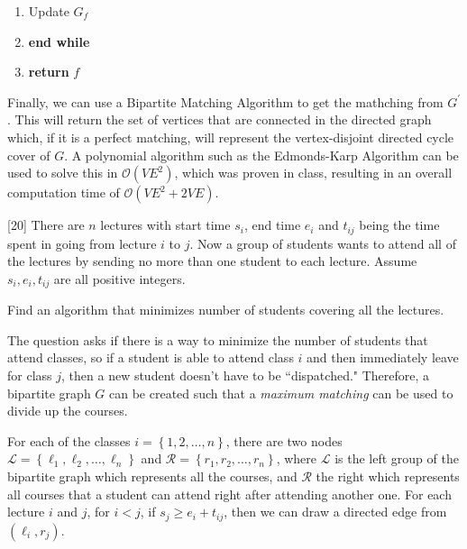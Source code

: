 \documentclass[addpoints]{exam}
\begin{document}
\begin{questions}
\begin{solution}
\begin{enumerate}
\item\hspace{3em}Update $G_{f}$

\item {\bf end while}
\item {\bf return} $f$
\end{enumerate}
\vspace{-1em}
Finally, we can use a Bipartite Matching Algorithm to get the mathching from $G^{\prime}$. This will return the set of vertices that are connected in the directed graph which, if it is a perfect matching, will represent the vertex-disjoint directed cycle cover of $G$. A polynomial algorithm such as the Edmonds-Karp Algorithm can be used to solve this in $\mathcal{O}\left(VE^{2}\right)$, which was proven in class, resulting in an overall computation time of $\mathcal{O}\left( VE^{2} + 2VE\right)$.
\end{solution}


[20]
There are $n$ lectures with start time $s_{i}$, end time $e_{i}$
and $t_{ij}$ being the time spent in going from lecture $i$ to $j$.
Now a group of students wants to attend all of the lectures by
sending no more than one student to each lecture. Assume $s_{i}, e_{i},
t_{ij}$ are all positive integers.

Find an algorithm that minimizes number of students covering all the
lectures.

\begin{solution}
The question asks if there is a way to minimize the number of students that attend classes, so if a student is able to attend class $i$ and then immediately leave for class $j$, then a new student doesn't have to be ``dispatched." Therefore, a bipartite graph $G$ can be created such that a {\em maximum matching} can be used to divide up the courses.%

For each of the classes $i = \left\{ 1,2,\ldots,n\right\}$, there are two nodes $\mathcal{L}=\left\{ \ell_{1}, \ell_{2}, \ldots, \ell_{n}\right\}$ and $\mathcal{R}=\left\{ r_{1}, r_{2}, \ldots, r_{n} \right\}$, where $\mathcal{L}$ is the left group of the bipartite graph which represents all the courses, and $\mathcal{R}$ the right which represents all courses that a student can attend right after attending another one. For each lecture $i$ and $j$, for $i < j$, if $s_{j}\geq e_{i} + t_{ij}$, then we can draw a directed edge from $\left( \ell_{i},r_{j} \right)$.



\end{solution}
\end{questions}
\end{document}
